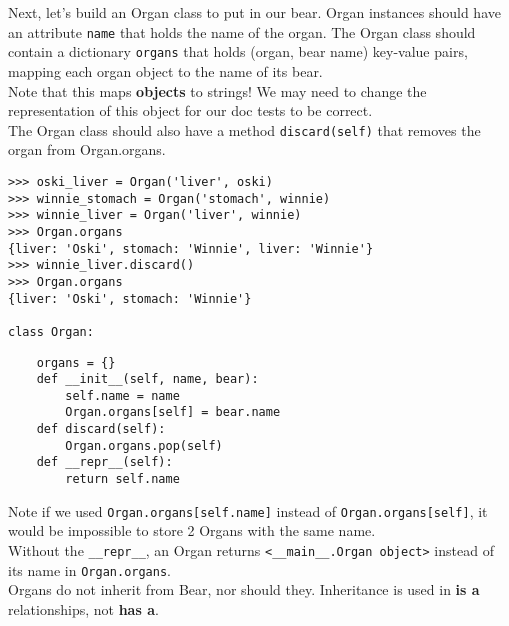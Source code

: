 \begin{blocksection}
\question Next, let's build an Organ class to put in our bear.
Organ instances should have an attribute \lstinline{name} that holds the name of the organ.
The Organ class should contain a dictionary \lstinline{organs} that holds (organ, bear name) key-value pairs, mapping each organ object to the name of its bear.
\\Note that this maps \textbf{objects} to strings! We may need to change the representation of this object for our doc tests to be correct.
\\The Organ class should also have a method \lstinline{discard(self)} that removes the organ from Organ.organs.

\vspace{1\baselineskip}
\begin{lstlisting}
>>> oski_liver = Organ('liver', oski)
>>> winnie_stomach = Organ('stomach', winnie)
>>> winnie_liver = Organ('liver', winnie)
>>> Organ.organs
{liver: 'Oski', stomach: 'Winnie', liver: 'Winnie'}
>>> winnie_liver.discard()
>>> Organ.organs
{liver: 'Oski', stomach: 'Winnie'}

class Organ:
\end{lstlisting}

\begin{nonsol}
\vspace{8\baselineskip}
\end{nonsol}

\begin{solution}
  \vspace{-0.5\baselineskip}
\begin{lstlisting}
    organs = {}
    def __init__(self, name, bear):
        self.name = name
        Organ.organs[self] = bear.name
    def discard(self):
        Organ.organs.pop(self)
    def __repr__(self):
        return self.name
\end{lstlisting}
Note if we used \lstinline{Organ.organs[self.name]} instead of \lstinline{Organ.organs[self]}, it would be impossible to store 2 Organs with the same name.
\\Without the \lstinline{__repr__}, an Organ returns \lstinline{<__main__.Organ object>} instead of its name in \lstinline{Organ.organs}.
\\Organs do not inherit from Bear, nor should they. Inheritance is used in \textbf{is a} relationships, not \textbf{has a}.
\end{solution}
\end{blocksection}


